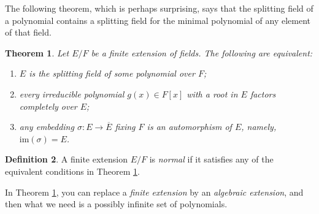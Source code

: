 \documentclass[12pt]{report}
\newtheorem{theorem}{Theorem}[section]
\newtheorem{lemma}[theorem]{Lemma}
\theoremstyle{definition}
\newtheorem{definition}[theorem]{Definition}
\newcommand{\im}{\text{im}}
\begin{document}
The following theorem, which is perhaps surprising, says that the splitting field of a polynomial contains a splitting field for the minimal polynomial of any element of that field.

\begin{theorem}\label{normal}
	Let $E/F$ be a finite extension of fields. The following are equivalent:
	\begin{enumerate}
		\item $E$ is the splitting field of some polynomial over $F$;
		\item every irreducible polynomial $g(x)\in F[x]$ with a root in $E$ factors completely over $E$;
		\item any embedding $\sigma: E\to \overline{E}$ fixing $F$ is an automorphism of $E$, namely, $\im(\sigma)=E$.
	\end{enumerate}
\end{theorem}

\begin{definition}
	A finite extension $E/F$ is \emph{normal} if it satisfies any of the equivalent conditions in Theorem \ref{normal}.
\end{definition}

\begin{remark}
	In Theorem \ref{normal}, you can replace a \emph{finite extension} by an \emph{algebraic extension}, and then what we need is a possibly infinite set of polynomials.
\end{remark}



\end{document}
